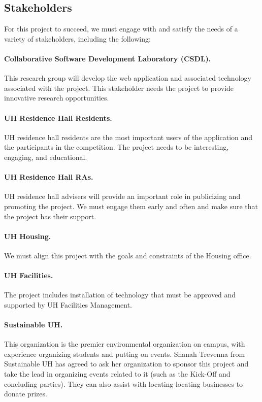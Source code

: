 \documentclass[11pt]{article}
\begin{document}
\subsection{Stakeholders}

For this project to succeed, we must engage with and satisfy the needs of a variety of stakeholders, including the following:

\paragraph{Collaborative Software Development Laboratory (CSDL).}   This research group will develop the web application and
associated technology associated with the project.  This stakeholder needs
the project to provide innovative research opportunities.

\paragraph{UH Residence Hall Residents.}  UH residence hall residents are the most important
users of the application and the participants in the competition.  The
project needs to be interesting, engaging, and educational.

\paragraph{UH Residence Hall RAs.}  UH residence hall advisers will provide an
important role in publicizing and promoting the project. We must engage
them early and often and make sure that the project  has their support. 

\paragraph{UH Housing.}  We must align this project with the goals and constraints of the Housing office. 

\paragraph{UH Facilities.}  The project includes installation of technology
that must be approved and supported by UH Facilities Management.

\paragraph{Sustainable UH.}  This organization is the premier environmental
organization on campus, with experience organizing students and putting on
events.  Shanah Trevenna from Sustainable UH has agreed to ask her
organization to sponsor this project and take the lead in organizing events
related to it (such as the Kick-Off and concluding parties).  They can also
assist with locating locating businesses to donate prizes.
\end{document}
